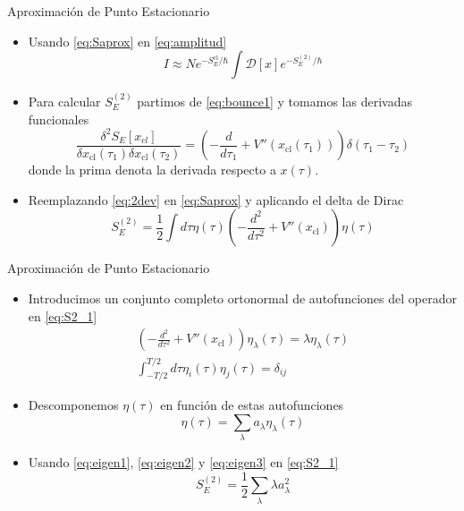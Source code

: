 \documentclass{beamer}
\theoremstyle{example}
\theoremstyle{example}
\begin{document}
\begin{frame}{Aproximación de Punto Estacionario}
\begin{itemize}
    \item Usando \eqref{eq:Saprox} en \eqref{eq:amplitud}
    \begin{equation}\label{eq:Iaprox}
        I \approx N e^{-S_E^{\textrm{cl}}/\hbar} \int \mathcal{D}[x] e^{-S_E^{(2)}/\hbar}
    \end{equation}
    
    \item Para calcular $S_E^{(2)}$ partimos de \eqref{eq:bounce1} y tomamos las derivadas funcionales
    \begin{equation}\label{eq:2dev}
        \frac{\delta^2 S_E[x_{cl}]}{\delta x_{\textrm{cl}}(\tau_1) \delta x_{\textrm{cl}}(\tau_2)} = \left( -\frac{d}{d\tau_1} + V''(x_{\textrm{cl}}(\tau_1)) \right) \delta(\tau_1 - \tau_2)
    \end{equation}
    donde la prima denota la derivada respecto a $x(\tau)$.
    
    \item Reemplazando \eqref{eq:2dev} en \eqref{eq:Saprox} y aplicando el delta de Dirac
    \begin{equation}\label{eq:S2_1}
        S_E^{(2)} = \frac{1}{2} \int d\tau  \eta(\tau) \left( - \frac{d^2}{d\tau^2} + V''(x_{\textrm{cl}})\right) \eta(\tau)
    \end{equation}
\end{itemize}
\end{frame}

\begin{frame}{Aproximación de Punto Estacionario}
\begin{itemize}
    \item Introducimos un conjunto completo ortonormal de autofunciones del operador en \eqref{eq:S2_1}
    \begin{gather} \label{eq:eigen1}
        \left( - \frac{d^2}{d\tau^2} + V''(x_{\textrm{cl}})\right) \eta_\lambda(\tau) = \lambda \eta_\lambda(\tau) \\ \label{eq:eigen2}
        \int_{-T/2}^{T/2} d\tau  \eta_i(\tau) \eta_j(\tau) = \delta_{ij}
    \end{gather}
    
    \item Descomponemos $\eta(\tau)$ en función de estas autofunciones
    \begin{equation}\label{eq:eigen3}
        \eta(\tau) = \sum_\lambda a_\lambda \eta_\lambda (\tau) 
    \end{equation}

    \item Usando \eqref{eq:eigen1}, \eqref{eq:eigen2} y \eqref{eq:eigen3} en \eqref{eq:S2_1}
    \begin{equation}\label{eq:S2_3}
        S_E^{(2)} = \frac{1}{2} \sum_\lambda \lambda a_\lambda^2
    \end{equation}
\end{itemize}
\end{frame}
\end{document}

